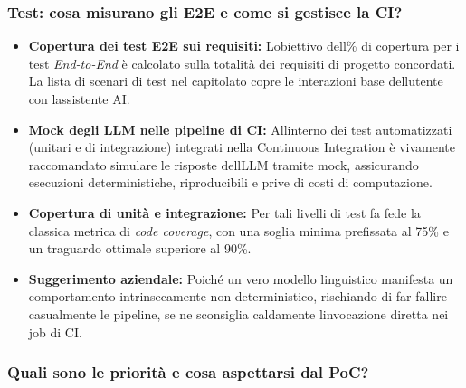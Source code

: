 \documentclass[12pt,a4paper]{article}
\newcommand{\tightlist}{\setlength{\itemsep}{1pt}\setlength{\parskip}{0pt}}
\begin{document}
\hypertarget{test-cosa-misurano-gli-e2e-e-come-si-gestisce-la-ci}{%
\subsubsection{\texorpdfstring{Test: cosa misurano gli E2E e come si gestisce la CI?}{Test: cosa misurano gli E2E e come si gestisce la CI?}}}

\begin{itemize}
\tightlist
\item \textbf{Copertura dei test E2E sui requisiti:} L\textquotesingle obiettivo dell\% di copertura per i test \emph{End-to-End} è calcolato sulla totalità dei requisiti di progetto concordati. La lista di scenari di test nel capitolato copre le interazioni base dell\textquotesingle utente con l\textquotesingle assistente AI.
\item \textbf{Mock degli LLM nelle pipeline di CI:} All\textquotesingle interno dei test automatizzati (unitari e di integrazione) integrati nella Continuous Integration è vivamente raccomandato simulare le risposte dell\textquotesingle LLM tramite mock, assicurando esecuzioni deterministiche, riproducibili e prive di costi di computazione.
\item \textbf{Copertura di unità e integrazione:} Per tali livelli di test fa fede la classica metrica di \emph{code coverage}, con una soglia minima prefissata al 75\% e un traguardo ottimale superiore al 90\%.
\item \textbf{Suggerimento aziendale:} Poiché un vero modello linguistico manifesta un comportamento intrinsecamente non deterministico, rischiando di far fallire casualmente le pipeline, se ne sconsiglia caldamente l\textquotesingle invocazione diretta nei job di CI.
\end{itemize}

\hypertarget{quali-sono-le-priorituxe0-e-cosa-aspettarsi-dal-poc}{%
\subsubsection{\texorpdfstring{Quali sono le priorità e cosa aspettarsi dal PoC?}{Quali sono le priorità e cosa aspettarsi dal PoC?}}}
\end{document}
